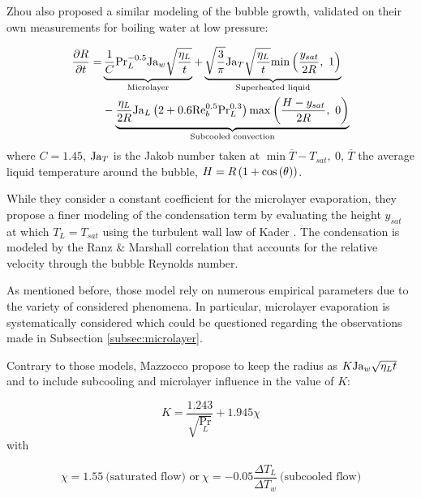 \npar

Zhou \etal \cite{zhou_experimental_2020} also proposed a similar modeling of the bubble growth, validated on their own measurements for boiling water at low pressure:


\begin{align}
\nonumber \dtime{R} = &\underbrace{ \frac{1}{C} \Pr_{L}^{-0.5}\Ja_{w} \sqrt{\dfrac{\eta_{L}}{t}} }_{\text{Microlayer}} + \underbrace{\sqrt{\dfrac{3}{\pi}}\Ja_{T} \sqrt{\dfrac{\eta_{L}}{t}}\min{\dfrac{y_{sat}}{2R},\ 1}}_{\text{Superheated liquid}}\\ 
%
& - \underbrace{\frac{\eta_{L}}{2R}\Ja_{L}\parth{2+0.6\Re_{b}^{0.5}\Pr_{L}^{0.3}}\max{\frac{H-y_{sat}}{2R},\ 0}}_{\text{Subcooled convection}}
\end{align}
where $C=1.45$, $\mathrm{Ja}_{T}$ is the Jakob number taken at $\min{\overline{T}-T_{sat},\ 0}$, $\overline{T}$ the average liquid temperature around the bubble, $H=R\left( 1+\mathrm{cos}\left( \theta \right) \right)$.

\npar

While they consider a constant coefficient for the microlayer evaporation, they propose a finer modeling of the condensation term by evaluating the height $y_{sat}$ at which $T_{L}=T_{sat}$ using the turbulent wall law of Kader \cite{kader_heat_1972}. The condensation is modeled by the Ranz \& Marshall correlation \cite{ranz_evaporation_1952} that accounts for the relative velocity through the bubble Reynolds number.


\begin{remark*}{}
As mentioned before, those model rely on numerous empirical parameters due to the variety of considered phenomena. In particular, microlayer evaporation is systematically considered which could be questioned regarding the observations made in Subsection \ref{subsec:microlayer}.
\end{remark*}

\npar

Contrary to those models, Mazzocco \etal \cite{mazzocco_reassessed_2018} propose to keep the radius as $K\mathrm{Ja}_{w}\sqrt{\eta_{L}t}$ and to include subcooling and microlayer influence in the value of $K$:

\begin{equation}
K = \frac{1.243}{\sqrt{\Pr_{L}}} + 1.945 \chi
\label{eq:Kgrowth_mazzocco}
\end{equation}
with

\begin{equation}
\chi = 1.55\ \text{(saturated flow) or}\ \chi = -0.05 \frac{\Delta T_{L}}{\Delta T_{w}}\ \text{(subcooled flow)}
\end{equation}

